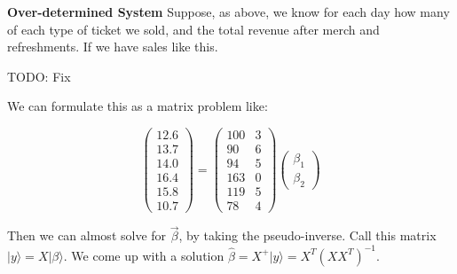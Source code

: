 \documentclass{amsbook}
\begin{document}
\begin{tcolorbox}[title=Example,colback=blue!5]
  {\bfseries\Large Over-determined System}\label{OverDeterminedSystem}
Suppose, as above, we know for each day how many of each type of ticket we sold, and the total revenue after merch and refreshments.  If we have sales like this. 

TODO: Fix

We can formulate this as a matrix problem like:

$$
\left(\begin{array}{c} 12.6\\13.7\\14.0\\16.4\\15.8\\10.7 \end{array}\right)=\left(\begin{array}{cc}100&3\\90&6\\94&5\\163&0\\119&5\\78&4 \end{array}\right)\left(\begin{array}{c}\beta_1 \\ \beta_2\end{array}\right)
$$

Then we can almost solve for $\vec\beta$, by taking the pseudo-inverse.  Call this matrix $|y\rangle=X|\beta\rangle$.  We come up with a solution $\hat\beta=X^+|y\rangle=X^T\left(XX^T\right)^{-1}$.
\end{tcolorbox}
\end{document}
